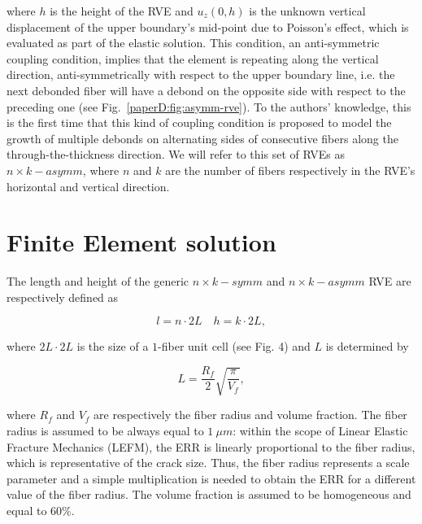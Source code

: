 where $h$ is the height of the RVE and $u_{z}\left(0,h\right)$ is the unknown vertical displacement of the upper boundary’s mid-point due to Poisson’s effect, which is evaluated as part of the elastic solution. This condition, an anti-symmetric coupling condition, implies that the element is repeating along the vertical direction, anti-symmetrically with respect to the upper boundary line, i.e. the next debonded fiber will have a debond on the opposite side with respect to the preceding one (see Fig.~\ref{paperD:fig:asymm-rve}). To the authors’ knowledge, this is the first time that this kind of coupling condition is proposed to model the growth of multiple debonds on alternating sides of consecutive fibers along the through-the-thickness direction. We will refer to this set of RVEs as $n \times k-asymm$, where $n$ and $k$ are the number of fibers respectively in the RVE’s horizontal and vertical direction.




\section{Finite Element solution}

The length and height of the generic $n \times k-symm$ and $n \times k-asymm$ RVE are respectively defined as

\begin{equation}
l=n\cdot2L\quad h=k\cdot2L,
\end{equation}

where $2L\cdot2L$ is the size of a $1$-fiber unit cell (see Fig. 4) and $L$ is determined by

\begin{equation}
L=\frac{R_{f}}{2}\sqrt{\frac{\pi}{V_{f}}},
\end{equation}

where $R_{f}$ and $V_{f}$ are respectively the fiber radius and volume fraction. The fiber radius is assumed to be always equal to $1\ μm$: within the scope of Linear Elastic Fracture Mechanics (LEFM), the ERR is linearly proportional to the fiber radius, which is representative of the crack size. Thus, the fiber radius represents a scale parameter and a simple multiplication is needed to obtain the ERR for a different value of the fiber radius. The volume fraction is assumed to be homogeneous and equal to $60\%$.

